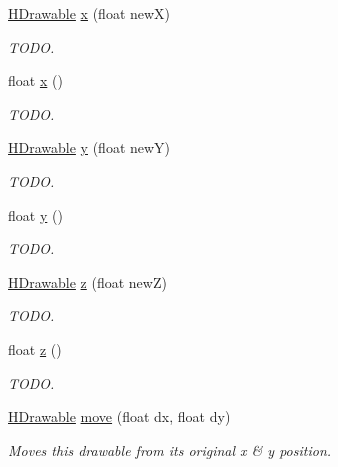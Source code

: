 \begin{DoxyCompactItemize}
\hyperlink{classhype_1_1core_1_1drawable_1_1_h_drawable}{H\-Drawable} \hyperlink{classhype_1_1core_1_1drawable_1_1_h_drawable_aecdbc8b9aa2e41f7e19d2b12f3f0d36e}{x} (float new\-X)
\begin{DoxyCompactList}\small\item\em T\-O\-D\-O. \end{DoxyCompactList}\item 
float \hyperlink{classhype_1_1core_1_1drawable_1_1_h_drawable_a16a4a0d69a27ed1604739b9bfa9aac10}{x} ()
\begin{DoxyCompactList}\small\item\em T\-O\-D\-O. \end{DoxyCompactList}\item 
\hyperlink{classhype_1_1core_1_1drawable_1_1_h_drawable}{H\-Drawable} \hyperlink{classhype_1_1core_1_1drawable_1_1_h_drawable_ac7bcfc7a213f2b55cf8d0a6cd647442a}{y} (float new\-Y)
\begin{DoxyCompactList}\small\item\em T\-O\-D\-O. \end{DoxyCompactList}\item 
float \hyperlink{classhype_1_1core_1_1drawable_1_1_h_drawable_a098090f981054ce26bbd4c9e23b0c47f}{y} ()
\begin{DoxyCompactList}\small\item\em T\-O\-D\-O. \end{DoxyCompactList}\item 
\hyperlink{classhype_1_1core_1_1drawable_1_1_h_drawable}{H\-Drawable} \hyperlink{classhype_1_1core_1_1drawable_1_1_h_drawable_adb23e4261e9f8101a908372d4f2285d2}{z} (float new\-Z)
\begin{DoxyCompactList}\small\item\em T\-O\-D\-O. \end{DoxyCompactList}\item 
float \hyperlink{classhype_1_1core_1_1drawable_1_1_h_drawable_abfe7cfead38fee117b343971def82916}{z} ()
\begin{DoxyCompactList}\small\item\em T\-O\-D\-O. \end{DoxyCompactList}\item 
\hyperlink{classhype_1_1core_1_1drawable_1_1_h_drawable}{H\-Drawable} \hyperlink{classhype_1_1core_1_1drawable_1_1_h_drawable_ab9246d4d8feb9277df280c3255ba9966}{move} (float dx, float dy)
\begin{DoxyCompactList}\small\item\em Moves this drawable from its original x \& y position. \end{DoxyCompactList}\item 

\end{DoxyCompactItemize}
